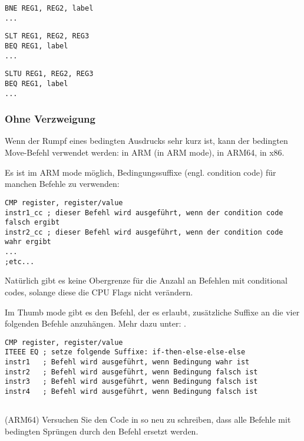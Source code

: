 \begin{lstlisting}[caption=Prüfe auf Ungleichheit,style=customasmMIPS]
BNE REG1, REG2, label
...
\end{lstlisting}
\begin{lstlisting}[caption=Prüfe auf größer{,} größer als
(vorzeichenbehaftet),style=customasmMIPS] SLT REG1, REG2, REG3
BEQ REG1, label
...
\end{lstlisting}
\begin{lstlisting}[caption=Prüfe auf kleiner{,} kleiner als
(vorzeichenlos),style=customasmMIPS] SLTU REG1, REG2, REG3
BEQ REG1, label
...
\end{lstlisting}

\subsubsection{Ohne Verzweigung}

Wenn der Rumpf eines bedingten Ausdrucks sehr kurz ist, kann der bedingten
Move-Befehl verwendet werden:
 in ARM (in ARM mode),  in ARM64,  in x86.

Es ist im ARM mode möglich, Bedingungssuffixe (engl. condition code) für manchen
Befehle zu verwenden:

\begin{lstlisting}[caption=ARM (\ARMMode),style=customasmARM]
CMP register, register/value
instr1_cc ; dieser Befehl wird ausgeführt, wenn der condition code falsch ergibt
instr2_cc ; dieser Befehl wird ausgeführt, wenn der condition code wahr ergibt
...
;etc...
\end{lstlisting}
Natürlich gibt es keine Obergrenze für die Anzahl an Befehlen mit conditional
codes, solange diese die CPU Flags nicht verändern.


Im Thumb mode gibt es den  Befehl, der es erlaubt, zusätzliche Suffixe
an die vier folgenden Befehle anzuhängen. Mehr dazu unter: .

\begin{lstlisting}[caption=ARM (\ThumbMode),style=customasmARM]
CMP register, register/value
ITEEE EQ ; setze folgende Suffixe: if-then-else-else-else
instr1   ; Befehl wird ausgeführt, wenn Bedingung wahr ist
instr2   ; Befehl wird ausgeführt, wenn Bedingung falsch ist
instr3   ; Befehl wird ausgeführt, wenn Bedingung falsch ist
instr4   ; Befehl wird ausgeführt, wenn Bedingung falsch ist
\end{lstlisting}

\subsection{\Exercise}
(ARM64) Versuchen Sie den Code in  so neu zu schreiben, dass
alle Befehle mit bedingten Sprüngen durch den  Befehl ersetzt werden.

